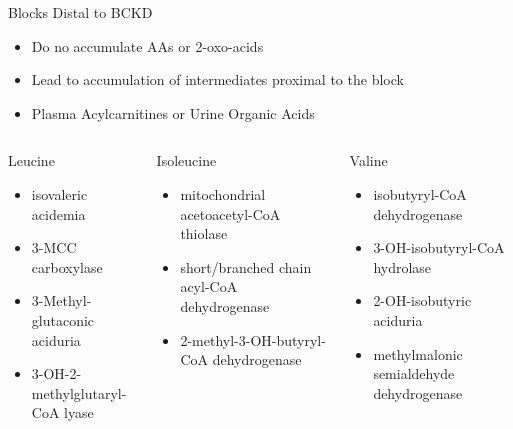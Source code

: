 \documentclass[presentation, smaller]{beamer}
\begin{document}
\begin{frame}[label={sec:orgheadline8}]{Blocks Distal to BCKD}
\begin{itemize}
\item Do no accumulate AAs or 2-oxo-acids
\item Lead to accumulation of intermediates proximal to the block
\item Plasma Acylcarnitines or Urine Organic Acids
\end{itemize}

\begin{columns}
\begin{column}{0.33\columnwidth}
\begin{block}{Leucine}
\begin{itemize}
\item isovaleric acidemia
\item 3-MCC carboxylase
\item 3-Methyl-glutaconic aciduria
\item 3-OH-2-methylglutaryl-CoA lyase
\end{itemize}
\end{block}
\end{column}

\begin{column}{0.33\columnwidth}
\begin{block}{Isoleucine}
\begin{itemize}
\item mitochondrial acetoacetyl-CoA thiolase
\item short/branched chain acyl-CoA dehydrogenase
\item 2-methyl-3-OH-butyryl-CoA dehydrogenase
\end{itemize}
\end{block}
\end{column}

\begin{column}{0.33\columnwidth}
\begin{block}{Valine}
\begin{itemize}
\item isobutyryl-CoA dehydrogenase
\item 3-OH-isobutyryl-CoA hydrolase
\item 2-OH-isobutyric aciduria
\item methylmalonic semialdehyde dehydrogenase
\end{itemize}
\end{block}
\end{column}
\end{columns}
\end{frame}
\end{document}
